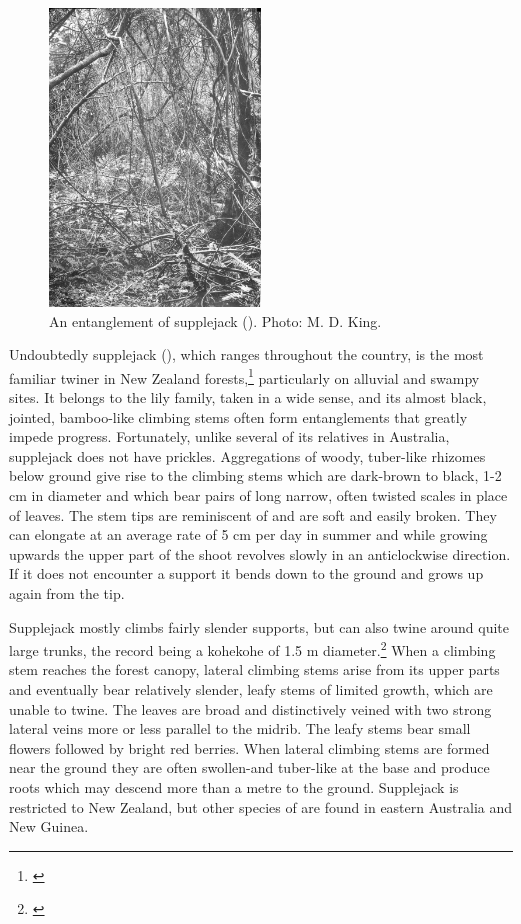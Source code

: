 \begin{figure}
	\includegraphics[width=0.5\textwidth]{graphics/figure33supplejack.jpg}
	\centering
	\caption[An entanglement of supplejack]{An entanglement of supplejack (). Photo:  M. D. King.}
	\label{fig:33supplejack}
\end{figure}

Undoubtedly supplejack (), which ranges throughout the country, is the most familiar twiner in New Zealand forests,\footnote{\cite{macmillan1973biological}} particularly on alluvial and swampy sites.
It belongs to the lily family, taken in a wide sense, and its almost black, jointed, bamboo-like climbing stems often form entanglements that greatly impede progress.
Fortunately, unlike several of its relatives in Australia, supplejack does not have prickles.
Aggregations of woody, tuber-like rhizomes below ground give rise to the climbing stems which are dark-brown to black, 1-2 cm in diameter and which bear pairs of long narrow, often twisted scales in place of leaves.
The stem tips are reminiscent of  and are soft and easily broken.
They can elongate at an average rate of 5 cm per day in summer and while growing upwards the upper part of the shoot revolves slowly in an anticlockwise direction.
If it does not encounter a support it bends down to the ground and grows up again from the tip.

Supplejack mostly climbs fairly slender supports, but can also twine around quite large trunks, the record being a kohekohe of 1.5 m diameter.\footnote{\cite{macmillan1973biological}}
When a climbing stem reaches the forest canopy, lateral climbing stems arise from its upper parts and eventually bear relatively slender, leafy stems of limited growth, which are unable to twine.
The leaves are broad and distinctively veined with two strong lateral veins more or less parallel to the midrib.
The leafy stems bear small flowers followed by bright red berries.
When lateral climbing stems are formed near the ground they are often swollen-and tuber-like at the base and produce roots which may descend more than a metre to the ground.
Supplejack is restricted to New Zealand, but other species of  are found in eastern Australia and New Guinea.

